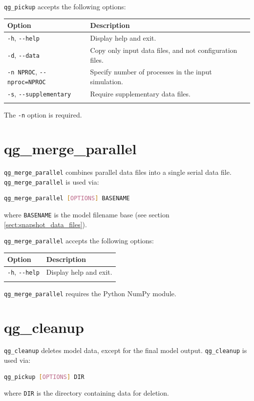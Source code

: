 \documentclass[a4paper]{book}
\begin{document}
\verb+qg_pickup+ accepts the following options:
\begin{longtable}{ | p{} | p{} | }
  \hline
  Option & Description \\
  \hline
  \endhead
  \verb+-h+, \verb+--help+  & Display help and exit. \\
  \verb+-d+, \verb+--data+  & Copy only input data files, and not configuration
                              files. \\
  \verb+-n NPROC+, \verb+--nproc=NPROC+ & Specify number of processes in the
                                          input simulation. \\
  \verb+-s+, \verb+--supplementary+     & Require supplementary data files. \\
  \hline
  \endfoot
\end{longtable}
The \verb+-n+ option is required.

\section{qg\_merge\_parallel}\label{sect:qg_merge_parallel}

\verb+qg_merge_parallel+ combines parallel data files into a single serial data
file. \verb+qg_merge_parallel+ is used via:
\begin{lstlisting}[language = bash, frame = single]
qg_merge_parallel [OPTIONS] BASENAME
\end{lstlisting}
where \verb+BASENAME+ is the model filename base (see section
\ref{sect:snapshot_data_files}).

\verb+qg_merge_parallel+ accepts the following options:
\begin{longtable}{ | p{} | p{} | }
  \hline
  Option & Description \\
  \hline
  \endhead
  \verb+-h+, \verb+--help+  & Display help and exit. \\
  \hline
  \endfoot
\end{longtable}

\verb+qg_merge_parallel+ requires the Python NumPy module.

\section{qg\_cleanup}\label{sect:qg_cleanup}

\verb+qg_cleanup+ deletes model data, except for the final model output.
\verb+qg_cleanup+ is used via:
\begin{lstlisting}[language = bash, frame = single]
qg_pickup [OPTIONS] DIR
\end{lstlisting}
where \verb+DIR+ is the directory containing data for deletion.
\end{document}
